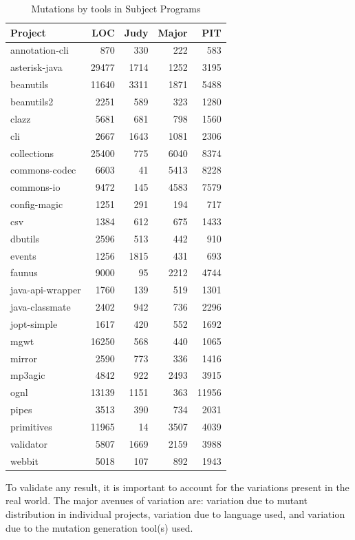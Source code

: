 \documentclass[conference]{IEEEtran}
\begin{document}
\begin{table}
\centering
\caption{Mutations by tools in Subject Programs}
{\small
\begin{tabular}{lrrrr}
  \hline
Project & LOC & Judy & Major & PIT \\ 
  \hline
annotation-cli & 870 & 330 & 222 & 583 \\ 
  asterisk-java & 29477 & 1714 & 1252 & 3195 \\ 
  beanutils & 11640 & 3311 & 1871 & 5488 \\ 
  beanutils2 & 2251 & 589 & 323 & 1280 \\ 
  clazz & 5681 & 681 & 798 & 1560 \\ 
  cli & 2667 & 1643 & 1081 & 2306 \\ 
  collections & 25400 & 775 & 6040 & 8374 \\ 
  commons-codec & 6603 &  41 & 5413 & 8228 \\ 
  commons-io & 9472 & 145 & 4583 & 7579 \\ 
  config-magic & 1251 & 291 & 194 & 717 \\ 
  csv & 1384 & 612 & 675 & 1433 \\ 
  dbutils & 2596 & 513 & 442 & 910 \\ 
  events & 1256 & 1815 & 431 & 693 \\ 
  faunus & 9000 &  95 & 2212 & 4744 \\ 
  java-api-wrapper & 1760 & 139 & 519 & 1301 \\ 
  java-classmate & 2402 & 942 & 736 & 2296 \\ 
  jopt-simple & 1617 & 420 & 552 & 1692 \\ 
  mgwt & 16250 & 568 & 440 & 1065 \\ 
  mirror & 2590 & 773 & 336 & 1416 \\ 
  mp3agic & 4842 & 922 & 2493 & 3915 \\ 
  ognl & 13139 & 1151 & 363 & 11956 \\ 
  pipes & 3513 & 390 & 734 & 2031 \\ 
  primitives & 11965 &  14 & 3507 & 4039 \\ 
  validator & 5807 & 1669 & 2159 & 3988 \\ 
  webbit & 5018 & 107 & 892 & 1943 \\ 
   \hline
\end{tabular}
}


\label{tbl:subjectsn}
\end{table}

To validate any result, it is important to account for the variations present
in the real world. The major avenues of variation are: variation due to mutant
distribution in individual projects, variation due to language used, and
variation due to the mutation generation tool(s) used.
\end{document}
